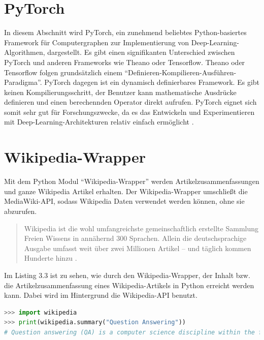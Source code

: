 \documentclass[
        ngerman,
        paper=a4,
        numbers=noendperiod,
]{scrreprt}
\begin{document}
\section{PyTorch}
In diesem Abschnitt wird PyTorch, ein zunehmend beliebtes Python-basiertes Framework für Computergraphen zur Implementierung von Deep-Learning-Algorithmen, dargestellt. Es gibt einen signifikanten Unterschied zwischen PyTorch und anderen Frameworks wie Theano oder Tensorflow. Theano oder Tensorflow folgen grundsätzlich einem \enquote{Definieren-Kompilieren-Ausführen-Paradigma}. PyTorch dagegen ist ein dynamisch definierbares Framework. Es gibt keinen Kompilierungsschritt, der Benutzer kann mathematische Ausdrücke definieren und einen berechennden Operator direkt aufrufen. PyTorch eignet sich somit sehr gut für Forschungszwecke, da es das Entwickeln und Experimentieren mit Deep-Learning-Architekturen relativ einfach ermöglicht \citep[S. 195]{Ketkar2017}.
\section{Wikipedia-Wrapper}
Mit dem Python Modul \enquote{Wikipedia-Wrapper} \citep{Goldsmith/Wikipedia:API} werden  Artikelzusammenfassungen und ganze Wikipedia Artikel erhalten. Der Wikipedia-Wrapper umschließt die MediaWiki-API, sodass Wikipedia Daten verwendet werden können, ohne sie abzurufen.

\begin{quote}
Wikipedia ist die wohl umfangreichste gemeinschaftlich erstellte
Sammlung Freien Wissens in annähernd 300 Sprachen. Allein die
deutschsprachige Ausgabe umfasst weit über zwei Millionen Artikel
– und täglich kommen Hunderte hinzu \citep{WIKIPEDIAWelt}.
\end{quote}

Im Listing 3.3 ist zu sehen, wie durch den Wikipedia-Wrapper, der Inhalt bzw. die Artikelzusammenfassung eines Wikipedia-Artikels in Python erreicht werden kann. Dabei wird im Hintergrund die Wikipedia-API \citep{API:HauptseiteMediaWiki} benutzt.


\begin{lstlisting}[language=Python, caption=Wikipedia Artikelzusammenfassungen]
>>> import wikipedia
>>> print(wikipedia.summary("Question Answering"))
# Question answering (QA) is a computer science discipline within the fields of information retrieval and natural language processing (NLP), which is concerned with building systems that automatically answer questions posed by humans in a natural language.
\end{lstlisting}
\end{document}

